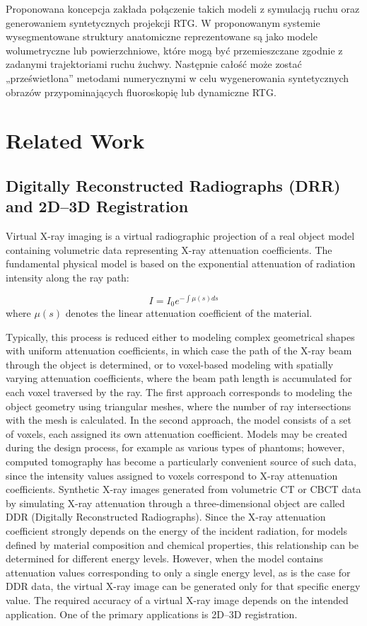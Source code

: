 \documentclass[11pt,a4paper]{article}
\begin{document}
Proponowana koncepcja zakłada połączenie takich modeli z symulacją ruchu oraz generowaniem syntetycznych projekcji RTG. W proponowanym systemie wysegmentowane struktury anatomiczne reprezentowane są jako modele wolumetryczne lub powierzchniowe, które mogą być przemieszczane zgodnie z zadanymi trajektoriami ruchu żuchwy. Następnie całość może zostać „prześwietlona” metodami numerycznymi w celu wygenerowania syntetycznych obrazów przypominających fluoroskopię lub dynamiczne RTG.


\section{Related Work}

\subsection{Digitally Reconstructed Radiographs (DRR) and 2D--3D Registration}

Virtual X-ray imaging is a virtual radiographic projection of a real object model containing volumetric data representing X-ray attenuation coefficients. The fundamental physical model is based on the exponential attenuation of radiation intensity along the ray path:

\begin{equation}
I=I_0 e^{-\int \mu(s)ds}
\end{equation}
where $\mu(s)$ denotes the linear attenuation coefficient of the material.

Typically, this process is reduced either to modeling complex geometrical shapes with uniform attenuation coefficients, in which case the path of the X-ray beam through the object is determined, or to voxel-based modeling with spatially varying attenuation coefficients, where the beam path length is accumulated for each voxel traversed by the ray.
The first approach corresponds to modeling the object geometry using triangular meshes, where the number of ray intersections with the mesh is calculated. In the second approach, the model consists of a set of voxels, each assigned its own attenuation coefficient. Models may be created during the design process, for example as various types of phantoms; however, computed tomography has become a particularly convenient source of such data, since the intensity values assigned to voxels correspond to X-ray attenuation coefficients. Synthetic X-ray images generated from volumetric CT or CBCT data by simulating X-ray attenuation through a three-dimensional object are called DDR (Digitally Reconstructed Radiographs).  Since the X-ray attenuation coefficient strongly depends on the energy of the incident radiation, for models defined by material composition and chemical properties, this relationship can be determined for different energy levels. However, when the model contains attenuation values corresponding to only a single energy level, as is the case for DDR data, the virtual X-ray image can be generated only for that specific energy value.
The required accuracy of a virtual X-ray image depends on the intended application. One of the primary applications is 2D–3D registration.
\end{document}
